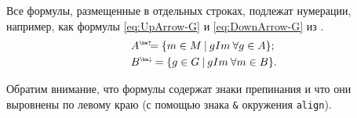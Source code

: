	Все формулы, размещенные в отдельных строках, подлежат нумерации, например, как формулы \eqref{eq:UpArrow-G} и \eqref{eq:DownArrow-G} из \cite{Ganter1999}.
	\begin{align}
	\label{eq:UpArrow-G}
	& A\uA =  \{ m\in{}M\:|\:gIm\:\forall  g \in{} A \}; \\
	\label{eq:DownArrow-G}
	& B\dA =  \{ g\in{}G\:|\:gIm\:\forall  m \in{} B \}.
	\end{align}

Обратим внимание, что формулы содержат знаки препинания и что они выровнены по левому краю (с помощью знака \verb|&| окружения \texttt{align}).
